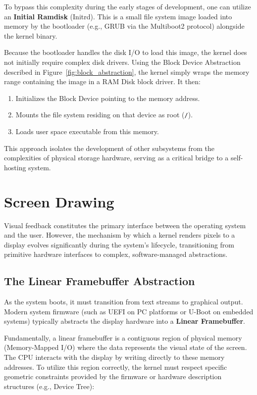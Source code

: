 \documentclass[a4paper,10pt,twoside]{report}
\theoremstyle{definition}
\begin{document}
To bypass this complexity during the early stages of development, one can utilize an \textbf{Initial Ramdisk} (Initrd). This is a small file system image loaded into memory by the bootloader (e.g., GRUB via the Multiboot2 protocol) alongside the kernel binary.

Because the bootloader handles the disk I/O to load this image, the kernel does not initially require complex disk drivers. Using the Block Device Abstraction described in Figure~\ref{fig:block_abstraction}, the kernel simply wraps the memory range containing the image in a RAM Disk block driver. It then:
\begin{enumerate}
    \item Initializes the Block Device pointing to the memory address.
    \item Mounts the file system residing on that device as root (\texttt{/}).
    \item Loads user space executable from this memory.
\end{enumerate}

This approach isolates the development of other subsystems from the complexities of physical storage hardware, serving as a critical bridge to a self-hosting system.

\section{Screen Drawing}
\label{sec:screen_drawing_theory}

Visual feedback constitutes the primary interface between the operating system and the user. However, the mechanism by which a kernel renders pixels to a display evolves significantly during the system's lifecycle, transitioning from primitive hardware interfaces to complex, software-managed abstractions.

\subsection{The Linear Framebuffer Abstraction}

As the system boots, it must transition from text streams to graphical output. Modern system firmware (such as UEFI on PC platforms or U-Boot on embedded systems) typically abstracts the display hardware into a \textbf{Linear Framebuffer}.

Fundamentally, a linear framebuffer is a contiguous region of physical memory (Memory-Mapped I/O) where the data represents the visual state of the screen. The CPU interacts with the display by writing directly to these memory addresses. To utilize this region correctly, the kernel must respect specific geometric constraints provided by the firmware or hardware description structures (e.g., Device Tree):
\end{document}

